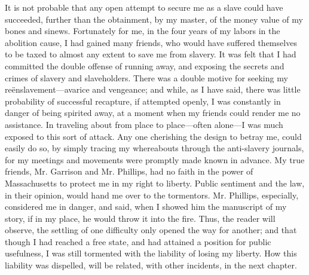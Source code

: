 It is not probable that any open attempt to secure me as a slave could
have succeeded, further than the obtainment, by my master, of the money
value of my bones and sinews. Fortunately for me, in the four years of
my labors in the abolition cause, I had gained many friends, who would
have suffered themselves to be taxed to almost any extent to save me
from slavery. It was felt that I had committed the double offense of
running away, and exposing the secrets and crimes of slavery and
slaveholders. There was a double motive for seeking my
reënslavement---avarice and vengeance; and while, as I have said, there
was little probability of successful recapture, if attempted openly, I
was constantly in danger of being spirited away, at a moment when my
friends could render me no assistance. In traveling about from place to
place---often alone---I was much exposed to this sort of attack. Any one
cherishing the {\protect\hypertarget{364}{}{}}design to betray me, could
easily do so, by simply tracing my whereabouts through the anti-slavery
journals, for my meetings and movements were promptly made known in
advance. My true friends, Mr. Garrison and Mr. Phillips, had no faith in
the power of Massachusetts to protect me in my right to liberty. Public
sentiment and the law, in their opinion, would hand me over to the
tormentors. Mr. Phillips, especially, considered me in danger, and said,
when I showed him the manuscript of my story, if in my place, he would
throw it into the fire. Thus, the reader will observe, the settling of
one difficulty only opened the way for another; and that though I had
reached a free state, and had attained a position for public usefulness,
I was still tormented with the liability of losing my liberty. How this
liability was dispelled, will be related, with other incidents, in the
next chapter.
